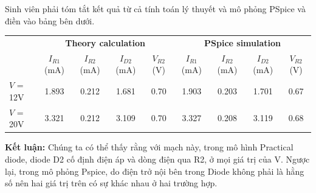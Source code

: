 Sinh viên phải tóm tắt kết quả từ cả tính toán lý thuyết và mô phỏng PSpice và điền vào bảng bên dưới.

\begin{table}[h]
    \centering
    \begin{tabular}{@{}lcccccccc@{}}
        \toprule
        & \multicolumn{4}{c}{\textbf{Theory calculation}} & \multicolumn{4}{c}{\textbf{PSpice simulation}} \\

        \cmidrule(rl{0.5cm}){2-5} \cmidrule(rl{0.5cm}){6-9}

        & \makecell{\(I_{R1}\) \\(mA)} & \makecell{\(I_{R2}\) \\ (mA)} & \makecell{\(I_{D2}\) \\ (mA)} & \makecell{\(V_{R2}\) \\ (V)} & \makecell{\(I_{R1}\) \\ (mA)} & \makecell{\(I_{R2}\) \\ (mA)} & \makecell{\(I_{D2}\) \\ (mA)} & \makecell{\(V_{R2}\) \\ (V)} \\

        \midrule

        \(V\) = 12V & 1.893 & 0.212 & 1.681 & 0.70 & 1.903 & 0.203 & 1.701 & 0.67 \\
        \(V\) = 20V & 3.321 & 0.212 & 3.109 & 0.70 & 3.327 & 0.208 & 3.119 & 0.68 \\

        \bottomrule
    \end{tabular}
\end{table}

\textbf{Kết luận:} Chúng ta có thể thấy rằng với mạch này, trong mô hình Practical diode, diode D2 cố định điện áp và dòng điện qua R2, ở mọi giá trị của V. Ngược lại, trong mô phỏng Pspice, do điện trở nội bên trong Diode không phải là hằng số nên hai giá trị trên có sự khác nhau ở hai trường hợp.